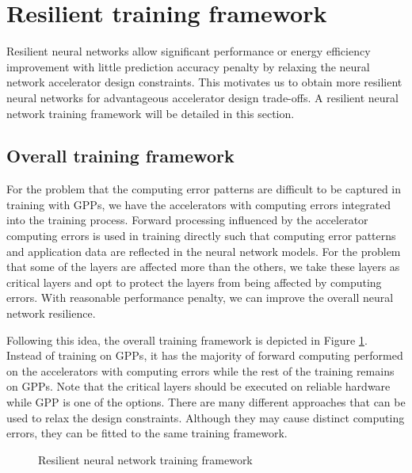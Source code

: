 \section{Resilient training framework} \label{sec:framework}
Resilient neural networks allow significant performance or 
energy efficiency improvement with little prediction accuracy penalty 
by relaxing the neural network accelerator design constraints. 
This motivates us to obtain more resilient neural networks 
for advantageous accelerator design trade-offs. 
A resilient neural network training framework will be 
detailed in this section. 

\subsection{Overall training framework}
For the problem that the computing error patterns are 
difficult to be captured in training with GPPs, 
we have the accelerators with computing errors integrated into 
the training process. Forward processing influenced by 
the accelerator computing errors is used in training directly 
such that computing error patterns and application data are 
reflected in the neural network models. For the problem that 
some of the layers are affected more than the others, 
we take these layers as critical layers and opt to 
protect the layers from being affected by computing errors. 
With reasonable performance penalty, we can improve the 
overall neural network resilience. 

Following this idea, the overall training framework is depicted in Figure \ref{fig:retrain}. 
Instead of training on GPPs, it has the majority of forward computing performed on the 
accelerators with computing errors while the rest of the training remains on GPPs.
Note that the critical layers should be executed on reliable hardware 
while GPP is one of the options. There are many different approaches 
that can be used to relax the design constraints.
Although they may cause distinct computing errors, they can be fitted to the 
same training framework.

\begin{figure}
        \caption{Resilient neural network training framework}
        \label{fig:retrain}
        \vspace{-1em}
\end{figure}

